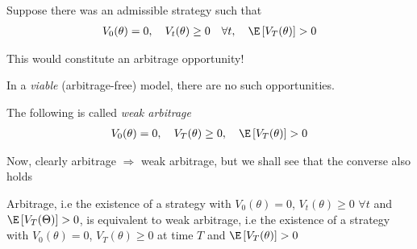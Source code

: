 \noindent Suppose there was an admissible strategy such that
\begin{equation*}
  \begin{gathered}
    V_0(\theta) = 0,\quad V_t(\theta)\geq0\quad\forall t,\quad \E\left[V_T(\theta)\right]>0
  \end{gathered}
\end{equation*}\par
\noindent This would constitute an arbitrage opportunity!\par
\noindent In a \textit{viable} (arbitrage-free) model, there are no such opportunities.
\par\bigskip
\noindent The following is called \textit{weak arbitrage}
\begin{equation*}
  \begin{gathered}
    V_0(\theta) = 0,\quad V_T(\theta)\geq0,\quad\E\left[V_T(\theta)\right]>0
  \end{gathered}
\end{equation*}\par
\noindent Now, clearly arbitrage $\Rightarrow$ weak arbitrage, but we shall see that the converse also holds
\par\bigskip
\begin{lem}{}
  Arbitrage, i.e the existence of a strategy with $V_0(\theta) = 0$, $V_t(\theta)\geq0$ $\forall t$ and $\E\left[V_T(\Theta)\right]>0$, is equivalent to weak arbitrage, i.e the existence of a strategy with $V_0(\theta) = 0$, $V_T(\theta)\geq0$ at time $T$ and $\E\left[V_T(\theta)\right]>0$
\end{lem}
\par\bigskip
